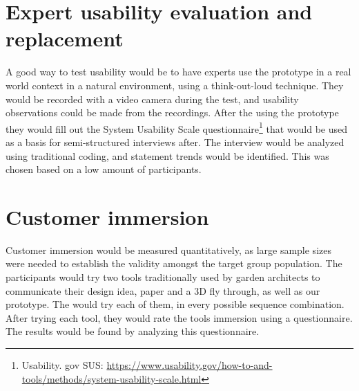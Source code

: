 \section{Expert usability evaluation and replacement}
A good way to test usability would be to have experts use the prototype in a real world context in a natural environment, using a think-out-loud technique. They would be recorded with a video camera during the test, and usability observations could be made from the recordings. After the using the prototype they would fill out the System Usability Scale questionnaire\footnote{Usability. gov SUS:  \url{https://www.usability.gov/how-to-and-tools/methods/system-usability-scale.html}} that would be used as a basis for semi-structured interviews after. The interview would be analyzed using traditional coding, and statement trends would be identified. This was chosen based on a low amount of participants.

\section{Customer immersion}
Customer immersion would be measured quantitatively, as large sample sizes were needed to establish the validity amongst the target group population. The participants would try two tools traditionally used by garden architects to communicate their design idea, paper and a 3D fly through, as well as our prototype. The would try each of them, in every possible sequence combination. After trying each tool, they would rate the tools immersion using a questionnaire. The results would be found by analyzing this questionnaire.